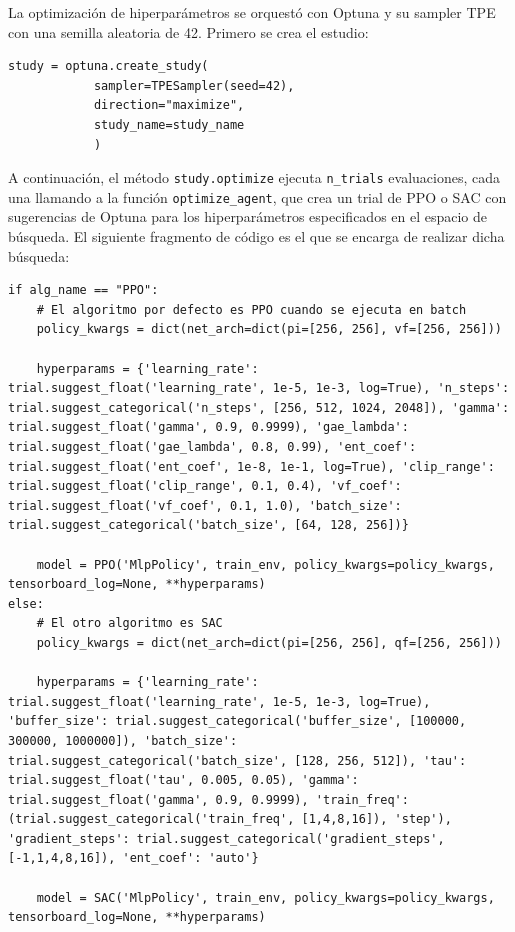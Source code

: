 La optimización de hiperparámetros se orquestó con Optuna y su sampler TPE con una semilla aleatoria de 42. Primero se crea el estudio: \\ 

\begin{lstlisting}
study = optuna.create_study(
			sampler=TPESampler(seed=42),
			direction="maximize",
			study_name=study_name
			)
\end{lstlisting}

A continuación, el método \texttt{study.optimize} ejecuta \texttt{n\_trials} evaluaciones, cada una llamando a la función \texttt{optimize\_agent}, que crea un trial de PPO o SAC con sugerencias de Optuna para los hiperparámetros especificados en el espacio de búsqueda. El siguiente fragmento de código es el que se encarga de realizar dicha búsqueda:  \\

\begin{lstlisting}
if alg_name == "PPO":
	# El algoritmo por defecto es PPO cuando se ejecuta en batch
	policy_kwargs = dict(net_arch=dict(pi=[256, 256], vf=[256, 256]))
	
	hyperparams = {'learning_rate': trial.suggest_float('learning_rate', 1e-5, 1e-3, log=True), 'n_steps': trial.suggest_categorical('n_steps', [256, 512, 1024, 2048]), 'gamma': trial.suggest_float('gamma', 0.9, 0.9999), 'gae_lambda': trial.suggest_float('gae_lambda', 0.8, 0.99), 'ent_coef': trial.suggest_float('ent_coef', 1e-8, 1e-1, log=True), 'clip_range': trial.suggest_float('clip_range', 0.1, 0.4), 'vf_coef': trial.suggest_float('vf_coef', 0.1, 1.0), 'batch_size': trial.suggest_categorical('batch_size', [64, 128, 256])}
	
	model = PPO('MlpPolicy', train_env, policy_kwargs=policy_kwargs, tensorboard_log=None, **hyperparams)
else:
	# El otro algoritmo es SAC
	policy_kwargs = dict(net_arch=dict(pi=[256, 256], qf=[256, 256]))
	
	hyperparams = {'learning_rate': trial.suggest_float('learning_rate', 1e-5, 1e-3, log=True), 'buffer_size': trial.suggest_categorical('buffer_size', [100000, 300000, 1000000]), 'batch_size': trial.suggest_categorical('batch_size', [128, 256, 512]), 'tau': trial.suggest_float('tau', 0.005, 0.05), 'gamma': trial.suggest_float('gamma', 0.9, 0.9999), 'train_freq': (trial.suggest_categorical('train_freq', [1,4,8,16]), 'step'), 'gradient_steps': trial.suggest_categorical('gradient_steps', [-1,1,4,8,16]), 'ent_coef': 'auto'}
	
	model = SAC('MlpPolicy', train_env, policy_kwargs=policy_kwargs, tensorboard_log=None, **hyperparams)
\end{lstlisting}

